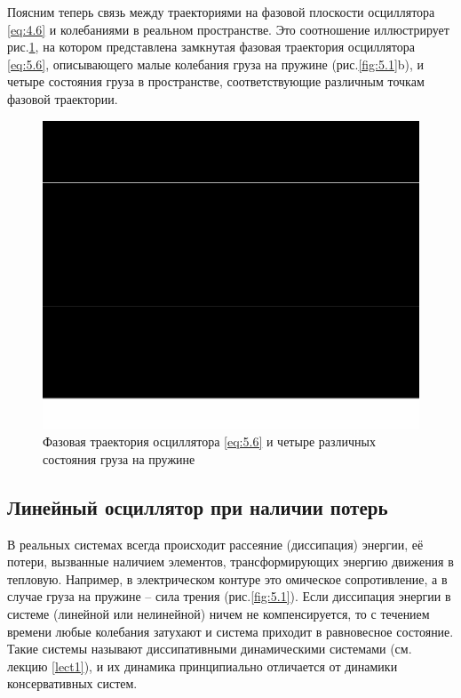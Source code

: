 Поясним теперь связь между траекториями на фазовой плоскости осциллятора \eqref{eq:4.6} и колебаниями в реальном пространстве. Это соотношение иллюстрирует рис.\ref{fig:5.3}, на котором представлена замкнутая фазовая траектория осциллятора \eqref{eq:5.6}, описывающего малые колебания груза на пружине (рис.\ref{fig:5.1}b), и четыре состояния груза в пространстве, соответствующие различным точкам фазовой траектории. 
\begin{figure}[h!]
        \centering
        \includegraphics[width=0.6\linewidth]{fig/lect5/3}
        \caption{Фазовая траектория осциллятора \eqref{eq:5.6} и четыре различных состояния груза на пружине  }
        \label{fig:5.3}
\end{figure}


\subsection{Линейный осциллятор при наличии потерь}%
\label{sub:5.1.2}

В реальных системах всегда происходит рассеяние (диссипация) энергии,
её потери, вызванные наличием элементов, трансформирующих энергию
движения в тепловую. Например, в электрическом контуре это омическое
сопротивление, а в случае груза на пружине – сила трения (рис.\ref{fig:5.1}). Если
диссипация энергии в системе (линейной или нелинейной) ничем не
компенсируется, то с течением времени любые колебания затухают и система
приходит в равновесное состояние. Такие системы называют диссипативными
динамическими системами (см. лекцию \ref{lect1}), и их динамика принципиально
отличается от динамики консервативных систем.

